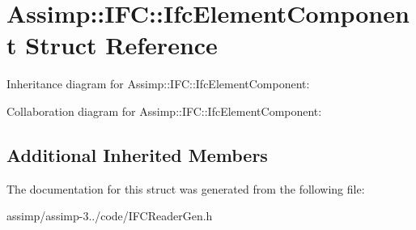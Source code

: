 \hypertarget{struct_assimp_1_1_i_f_c_1_1_ifc_element_component}{\section{Assimp\+:\+:I\+F\+C\+:\+:Ifc\+Element\+Component Struct Reference}
\label{struct_assimp_1_1_i_f_c_1_1_ifc_element_component}
}


Inheritance diagram for Assimp\+:\+:I\+F\+C\+:\+:Ifc\+Element\+Component\+:


Collaboration diagram for Assimp\+:\+:I\+F\+C\+:\+:Ifc\+Element\+Component\+:
\subsection*{Additional Inherited Members}


The documentation for this struct was generated from the following file\+:\begin{DoxyCompactItemize}
\item 
assimp/assimp-\/3../code/I\+F\+C\+Reader\+Gen.\+h\end{DoxyCompactItemize}
